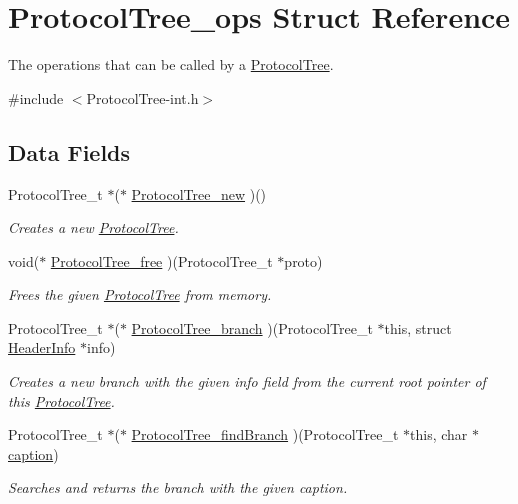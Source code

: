 \hypertarget{struct_protocol_tree__ops}{\section{Protocol\-Tree\-\_\-ops Struct Reference}
\label{struct_protocol_tree__ops}
}


The operations that can be called by a \hyperlink{struct_protocol_tree}{Protocol\-Tree}.  




{\ttfamily \#include $<$Protocol\-Tree-\/int.\-h$>$}

\subsection*{Data Fields}
\begin{DoxyCompactItemize}
\item 
Protocol\-Tree\-\_\-t $\ast$($\ast$ \hyperlink{struct_protocol_tree__ops_a799c780a3f4a6b1a3b5399b52dec9f3b}{Protocol\-Tree\-\_\-new} )()
\begin{DoxyCompactList}\small\item\em Creates a new \hyperlink{struct_protocol_tree}{Protocol\-Tree}. \end{DoxyCompactList}\item 
void($\ast$ \hyperlink{struct_protocol_tree__ops_a35f233952b5640b3796d35866ac336f4}{Protocol\-Tree\-\_\-free} )(Protocol\-Tree\-\_\-t $\ast$proto)
\begin{DoxyCompactList}\small\item\em Frees the given \hyperlink{struct_protocol_tree}{Protocol\-Tree} from memory. \end{DoxyCompactList}\item 
Protocol\-Tree\-\_\-t $\ast$($\ast$ \hyperlink{struct_protocol_tree__ops_ac1928d62cf84464df8c5ab377b3599d0}{Protocol\-Tree\-\_\-branch} )(Protocol\-Tree\-\_\-t $\ast$this, struct \hyperlink{struct_header_info}{Header\-Info} $\ast$info)
\begin{DoxyCompactList}\small\item\em Creates a new branch with the given info field from the current root pointer of this \hyperlink{struct_protocol_tree}{Protocol\-Tree}. \end{DoxyCompactList}\item 
Protocol\-Tree\-\_\-t $\ast$($\ast$ \hyperlink{struct_protocol_tree__ops_a8429998583f5e91b4ae2ec19767158ae}{Protocol\-Tree\-\_\-find\-Branch} )(Protocol\-Tree\-\_\-t $\ast$this, char $\ast$\hyperlink{_protocol_tree_8h_a63ae034482d14155f153ac2f8d4e4971}{caption})
\begin{DoxyCompactList}\small\item\em Searches and returns the branch with the given caption. \end{DoxyCompactList}\end{DoxyCompactItemize}


